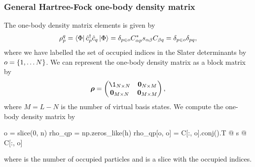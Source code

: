             \subsubsection{General Hartree-Fock one-body density matrix}
                The one-body density matrix elements is given by
                \begin{align}
                    \rho^{q}_{p}
                    = \bra{\Phi}
                    \hat{c}_{p}^{\dagger}
                    \hat{c}_{q}
                    \ket{\Phi}
                    = \delta_{p \in o}
                    C^{*}_{\alpha p} s_{\alpha\beta}
                    C_{\beta q}
                    = \delta_{p \in o}
                    \delta_{pq},
                \end{align}
                where we have labelled the set of occupied indices in the Slater
                determinants by $o = \left\{ 1, \dots N \right\}$.
                We can represent the one-body density matrix as a block matrix
                by
                \begin{align}
                    \vfg{\densityten}
                    = \begin{pmatrix}
                        \1_{N \times N} & \vfg{0}_{N \times M} \\
                        \vfg{0}_{M \times N} & \vfg{0}_{M \times M}
                    \end{pmatrix},
                \end{align}
                where $M = L - N$ is the number of virtual basis states.
                We compute the one-body density matrix by
                \begin{python}
o = slice(0, n)
rho_qp = np.zeros_like(h)
rho_qp[o, o] = C[:, o].conj().T @ s @ C[:, o]
                \end{python}
                where  is the number of occupied particles and 
                is a slice with the occupied indices.


